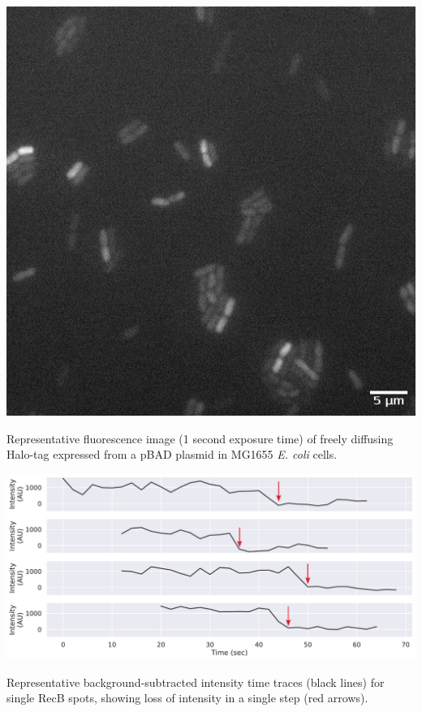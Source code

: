 \begin{suppfigure*}[htbp]
    \begin{center}
    \includegraphics[width=.5\linewidth]{SI_Figures/Free_Halo_image.png}
    \end{center}
    \caption{Representative fluorescence image (1 second exposure time) of freely diffusing Halo-tag expressed from a pBAD plasmid in MG1655 \textit{E. coli} cells.}
    \label{SIFig:freehalo_image}
\end{suppfigure*}

\begin{suppfigure*}[htbp]
    \begin{center}
    \includegraphics[width=.8\linewidth]{SI_Figures/SM_traces.pdf}
    \end{center}
    \caption{Representative background-subtracted intensity time traces (black lines) for single RecB spots, showing loss of intensity in a single step (red arrows).}
    \label{SIFig:SM_traces}
    \end{suppfigure*}

